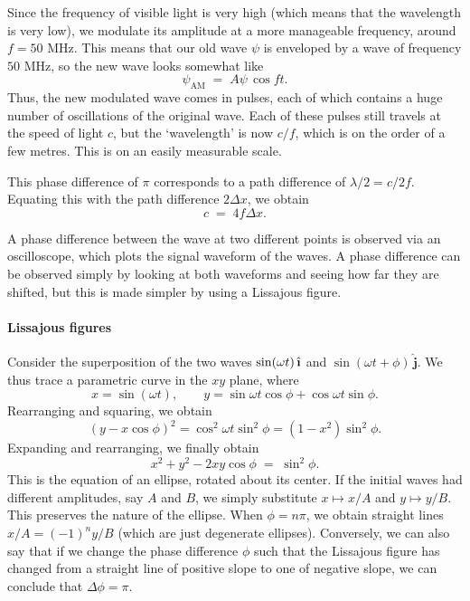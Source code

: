 \documentclass[11pt]{article}
\begin{document}
        Since the frequency of visible light is very high (which means that the wavelength is very low), we modulate its amplitude at a more manageable
        frequency, around $f = 50$ MHz. This means that our old wave $\psi$ is enveloped by a wave of frequency $50$ MHz, so 
        the new wave looks somewhat like
        \[
                \psi_\text{AM} \;=\; A\psi\,\cos{ft}.
        \]
        Thus, the new modulated wave comes in pulses, each of which contains a huge number of oscillations of the original wave.
        Each of these pulses still travels at the speed of light $c$, but the `wavelength' is now $c /f$, which is on the order of a few metres.
        This is on an easily measurable scale.

        This phase difference of $\pi$ corresponds to a path difference of $\lambda /2 = c /2f$. Equating this with the path difference $2\Delta x$,
        we obtain
        \[
                c \;=\; 4f\Delta x.
        \]

        A phase difference between the wave at two different points is observed via an oscilloscope, which plots the signal waveform
        of the waves. A phase difference can be observed simply by looking at both waveforms and seeing how far they are shifted,
        but this is made simpler by using a Lissajous figure.

        \paragraph{Lissajous figures}
        Consider the superposition of the two waves $\sin(\omega t)\,\hat{\textbf{\i}}$ and $\sin(\omega t + \phi)\,\hat{\textbf{j}}$.
        We thus trace a parametric curve in the $xy$ plane, where
        \[
                x = \sin(\omega t), \qquad y = \sin{\omega t}\cos{\phi} + \cos{\omega t}\sin{\phi}.
        \]
        Rearranging and squaring, we obtain
        \[
                (y - x\cos\phi)^2 = \cos^2{\omega t}\sin^2\phi = (1 - x^2)\sin^2\phi.
        \]
        Expanding and rearranging, we finally obtain
        \[
                x^2 + y^2 - 2xy\cos\phi \;=\; \sin^2\phi. 
        \]
        This is the equation of an ellipse, rotated about its center. If the initial waves had different amplitudes, say $A$ and $B$, we simply
        substitute $x \mapsto x /A$ and $y \mapsto y / B$. This preserves the nature of the ellipse. When $\phi = n\pi$, we obtain
        straight lines $x / A = (-1)^n y / B$ (which are just degenerate ellipses).
        Conversely, we can also say that if we change the phase difference $\phi$ such that the Lissajous figure
        has changed from a straight line of positive slope to one of negative slope, we can conclude that $\Delta\phi = \pi$.
\end{document}
